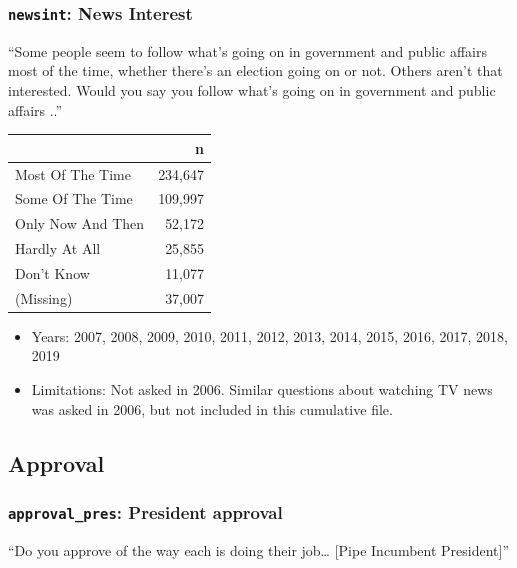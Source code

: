 \documentclass[10pt,article,oneside]{memoir}
\theoremstyle{definition}
\begin{document}
\hypertarget{newsint-news-interest}{%
\subsubsection{\texorpdfstring{\texttt{newsint}: News
Interest}{newsint: News Interest}}\label{newsint-news-interest}}

``Some people seem to follow what's going on in government and public
affairs most of the time, whether there's an election going on or not.
Others aren't that interested. Would you say you follow what's going on
in government and public affairs ..''

\begin{table}[H]
\centering
\begin{tabular}{lr}
\toprule
 & n\\
\midrule
Most Of The Time & 234,647\\
Some Of The Time & 109,997\\
Only Now And Then & 52,172\\
Hardly At All & 25,855\\
Don't Know & 11,077\\
(Missing) & 37,007\\
\bottomrule
\end{tabular}
\end{table}

\begin{itemize}
\tightlist
\item
  Years: 2007, 2008, 2009, 2010, 2011, 2012, 2013, 2014, 2015, 2016,
  2017, 2018, 2019
\item
  Limitations: Not asked in 2006. Similar questions about watching TV
  news was asked in 2006, but not included in this cumulative file.
\end{itemize}

\hypertarget{approval}{%
\subsection{Approval}\label{approval}}

\hypertarget{approval_pres-president-approval}{%
\subsubsection{\texorpdfstring{\texttt{approval\_pres}: President
approval}{approval\_pres: President approval}}\label{approval_pres-president-approval}}

``Do you approve of the way each is doing their job\ldots{} {[}Pipe
Incumbent President{]}''
\end{document}
